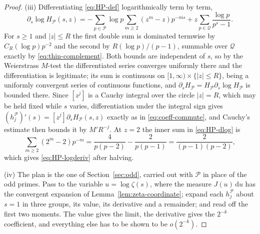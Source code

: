 \documentclass[11pt]{amsart}
\theoremstyle{plain}
\theoremstyle{definition}
\newcommand{\dd}{\,\mathrm d}
\newcommand{\abs}[1]{\lvert #1\rvert}
\begin{document}
\begin{proof}
(iii) Differentiating \eqref{eq:HP-def} logarithmically term by term,
\begin{equation}\label{eq:HP-dlog}
  \partial_s\log H_{\mathcal P}(s,z)
   =-\sum_{p\in\mathcal P}\log p\sum_{m\geq2}(z^m-z)p^{-ms}
    +z\sum_{p\in\mathcal Q}\frac{\log p}{p^{s}-1}.
\end{equation}
For $s\geq1$ and $\abs z\leq R$ the first double sum is dominated termwise by
$C_R(\log p)p^{-2}$ and the second by $R(\log p)/(p-1)$, summable over
$\mathcal Q$ exactly by \eqref{eq:thin-complement}. Both bounds are
independent of $s$, so by the Weierstrass $M$-test the differentiated series
converges uniformly there and the differentiation is legitimate; its sum is
continuous on $[1,\infty)\times\{\abs z\leq R\}$, being a uniformly convergent
series of continuous functions, and
$\partial_sH_{\mathcal P}=H_{\mathcal P}\partial_s\log H_{\mathcal P}$ is
bounded there. Since $[z^j]$ is a Cauchy integral over the circle $\abs z=R$,
which may be held fixed while $s$ varies, differentiation under the integral
sign gives $(h_j^{\mathcal P})'(s)=[z^j]\partial_sH_{\mathcal P}(s,z)$ exactly
as in \eqref{eq:coeff-commute}, and Cauchy's estimate then bounds it by
$M'R^{-j}$. At $z=2$ the inner sum in \eqref{eq:HP-dlog} is
\[
  \sum_{m\geq2}(2^m-2)p^{-m}
   =\frac{4}{p(p-2)}-\frac{2}{p(p-1)}
   =\frac{2}{(p-1)(p-2)},
\]
which gives \eqref{eq:HP-logderiv} after halving.

(iv) The plan is the one of Section~\ref{sec:odd}, carried out with $\mathcal P$ in place
of the odd primes. Pass to the variable $u=\log\zeta(s)$, where the measure
$J(u)\dd u$ has the convergent expansion of
Lemma~\ref{lem:zeta-coordinate}; expand each $h_j^{\mathcal P}$ about $s=1$ in
three groups, its value, its derivative and a remainder; and read off the
first two moments. The value gives the limit, the derivative gives the
$2^{-k}$ coefficient, and everything else has to be shown to be $o(2^{-k})$.


\end{proof}
\end{document}

